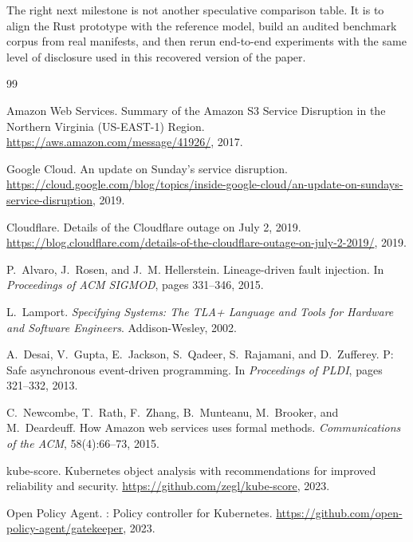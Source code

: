 \documentclass[10pt,twocolumn]{article}
\begin{document}
The right next milestone is not another speculative comparison table.  It is to
align the Rust prototype with the reference model, build an audited benchmark
corpus from real manifests, and then rerun end-to-end experiments with the same
level of disclosure used in this recovered version of the paper.


\begin{thebibliography}{99}

Amazon Web Services.
\newblock Summary of the {Amazon S3} Service Disruption in the Northern
  {Virginia} ({US-EAST-1}) Region.
\newblock \url{https://aws.amazon.com/message/41926/}, 2017.

Google Cloud.
\newblock An update on {Sunday's} service disruption.
\newblock \url{https://cloud.google.com/blog/topics/inside-google-cloud/an-update-on-sundays-service-disruption}, 2019.

Cloudflare.
\newblock Details of the {Cloudflare} outage on {July 2, 2019}.
\newblock \url{https://blog.cloudflare.com/details-of-the-cloudflare-outage-on-july-2-2019/}, 2019.

P.~Alvaro, J.~Rosen, and J.~M. Hellerstein.
\newblock Lineage-driven fault injection.
\newblock In \emph{Proceedings of ACM SIGMOD}, pages 331--346, 2015.

L.~Lamport.
\newblock \emph{Specifying Systems: The TLA+ Language and Tools for Hardware
  and Software Engineers}.
\newblock Addison-Wesley, 2002.

A.~Desai, V.~Gupta, E.~Jackson, S.~Qadeer, S.~Rajamani, and D.~Zufferey.
\newblock P: Safe asynchronous event-driven programming.
\newblock In \emph{Proceedings of PLDI}, pages 321--332, 2013.

C.~Newcombe, T.~Rath, F.~Zhang, B.~Munteanu, M.~Brooker, and M.~Deardeuff.
\newblock How {Amazon} web services uses formal methods.
\newblock \emph{Communications of the ACM}, 58(4):66--73, 2015.

kube-score.
\newblock Kubernetes object analysis with recommendations for improved
  reliability and security.
\newblock \url{https://github.com/zegl/kube-score}, 2023.

Open Policy Agent.
: Policy controller for Kubernetes.
\newblock \url{https://github.com/open-policy-agent/gatekeeper}, 2023.


\end{thebibliography}
\end{document}
